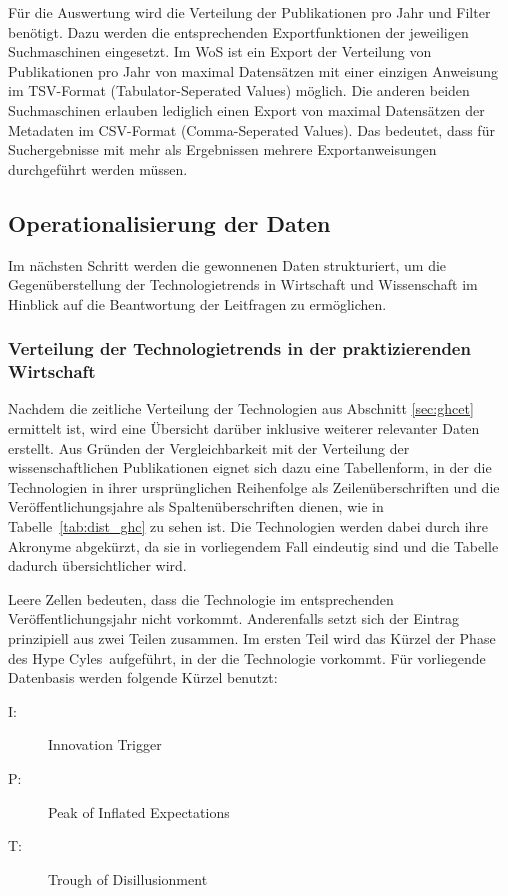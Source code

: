 Für die Auswertung wird die Verteilung der Publikationen pro Jahr und Filter benötigt. Dazu werden die entsprechenden Exportfunktionen der jeweiligen Suchmaschinen eingesetzt. Im WoS ist ein Export der Verteilung von Publikationen pro Jahr von maximal  Datensätzen mit einer einzigen Anweisung im TSV-Format (Tabulator-Seperated Values) möglich. Die anderen beiden Suchmaschinen erlauben lediglich einen Export von maximal  Datensätzen der Metadaten im CSV-Format (Comma-Seperated Values). Das bedeutet, dass für Suchergebnisse mit mehr als  Ergebnissen mehrere Exportanweisungen durchgeführt werden müssen.

\subsection{Operationalisierung der Daten}
Im nächsten Schritt werden die gewonnenen Daten strukturiert, um die Gegenüberstellung der Technologietrends in Wirtschaft und Wissenschaft im Hinblick auf die Beantwortung der Leitfragen zu ermöglichen.

\subsubsection{Verteilung der Technologietrends in der praktizierenden Wirtschaft}
Nachdem die zeitliche Verteilung der Technologien aus Abschnitt \ref{sec:ghcet} ermittelt ist, wird eine Übersicht darüber inklusive weiterer relevanter Daten erstellt. Aus Gründen der Vergleichbarkeit mit der Verteilung der wissenschaftlichen Publikationen eignet sich dazu eine Tabellenform, in der die Technologien in ihrer ursprünglichen Reihenfolge als Zeilenüberschriften und die Veröffentlichungsjahre als Spaltenüberschriften dienen, wie in Tabelle~\ref{tab:dist_ghc} zu sehen ist. Die Technologien werden dabei durch ihre Akronyme abgekürzt, da sie in vorliegendem Fall eindeutig sind und die Tabelle dadurch übersichtlicher wird.

Leere Zellen bedeuten, dass die Technologie im entsprechenden Veröffentlichungsjahr nicht vorkommt. Anderenfalls setzt sich der Eintrag prinzipiell aus zwei Teilen zusammen. Im ersten Teil wird das Kürzel der Phase des \glqq Hype Cyles\grqq~aufgeführt, in der die Technologie vorkommt. Für vorliegende Datenbasis werden folgende Kürzel benutzt:

\begin{description}
	\item[I:] Innovation Trigger
	\item[P:] Peak of Inflated Expectations
	\item[T:] Trough of Disillusionment
\end{description}


